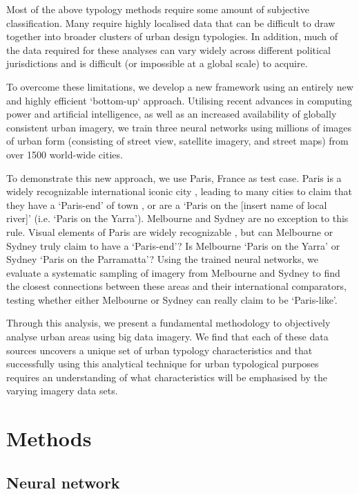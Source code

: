 \documentclass[10pt,letterpaper,hidelinks]{article}
\begin{document}
Most of the above typology methods require some amount of subjective classification. Many require highly localised data that can be difficult to draw together into broader clusters of urban design typologies. In addition, much of the data required for these analyses can vary widely across different political jurisdictions and is difficult (or impossible at a global scale) to acquire. 

To overcome these limitations, we develop a new framework using an entirely new and highly efficient `bottom-up` approach. Utilising recent advances in computing power and artificial intelligence, as well as an increased availability of globally consistent urban imagery, we train three neural networks using millions of images of urban form (consisting of street view, satellite imagery, and street maps) from over 1500 world-wide cities. 

To demonstrate this new approach, we use Paris, France as test case. Paris is a widely recognizable international iconic city \cite{Anholt2006}, leading to many cities to claim that they have a `Paris-end' of town \cite{Williams2010}, or are a `Paris on the [insert name of local river]' \cite{Wilden2013} (i.e. `Paris on the Yarra'). Melbourne and Sydney are no exception to this rule. Visual elements of Paris are widely recognizable \cite{Doersch2012}, but can Melbourne or Sydney truly claim to have a `Paris-end'? Is Melbourne `Paris on the Yarra' or Sydney `Paris on the Parramatta'? Using the trained neural networks, we evaluate a systematic sampling of imagery from Melbourne and Sydney to find the closest connections between these areas and their international comparators, testing whether either Melbourne or Sydney can really claim to be `Paris-like'.

Through this analysis, we present a fundamental methodology to objectively analyse urban areas using big data imagery. We find that each of these data sources uncovers a unique set of urban typology characteristics and that successfully using this analytical technique for urban typological purposes requires an understanding of what characteristics will be emphasised by the varying imagery data sets.

\section*{Methods}\label{sec:methods}
\subsection*{Neural network}\label{sec:methods1}
\end{document}
